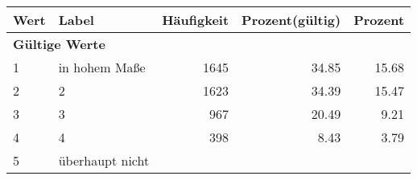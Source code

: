      \begin{longtable}{lXrrr}
     \toprule
     \textbf{Wert} & \textbf{Label} & \textbf{Häufigkeit} & \textbf{Prozent(gültig)} & \textbf{Prozent} \\
     \endhead
     \midrule
     \multicolumn{5}{l}{\textbf{Gültige Werte}}\\

     1 &
     \multicolumn{1}{X}{ in hohem Maße   } &


       \num{1645} &
       \num[round-mode=places,round-precision=2]{34,85} &
         \num[round-mode=places,round-precision=2]{15,68} \\

     2 &
     \multicolumn{1}{X}{ 2   } &


       \num{1623} &
       \num[round-mode=places,round-precision=2]{34,39} &
         \num[round-mode=places,round-precision=2]{15,47} \\

     3 &
     \multicolumn{1}{X}{ 3   } &


       \num{967} &
       \num[round-mode=places,round-precision=2]{20,49} &
         \num[round-mode=places,round-precision=2]{9,21} \\

     4 &
     \multicolumn{1}{X}{ 4   } &


       \num{398} &
       \num[round-mode=places,round-precision=2]{8,43} &
         \num[round-mode=places,round-precision=2]{3,79} \\

     5 &
     \multicolumn{1}{X}{ überhaupt nicht   } &



\end{longtable}
